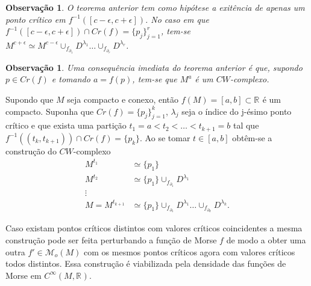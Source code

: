 \documentclass[12pt]{book}
\newtheorem{observacao}[teorema]{Observação}
\newcommand{\funcoesmorse}[1]{\mathcal{M}_{o}(#1)}
\newcommand{\funcoessuaves}[1]{C^{\infty}(#1, \real{})}
\newcommand{\pontoscriticos}[1]{\textit{Cr}(#1)}
\newcommand{\real}[1]{\mathbb{R}^{#1}}
\newcommand{\reta}{\real{}}
\begin{document}
	\begin{observacao}
		O teorema anterior tem como hipótese a exitência de apenas um ponto crítico em $f^{-1}([c-\epsilon,c+\epsilon])$. No caso em que $f^{-1}([c-\epsilon,c+\epsilon]) \cap \pontoscriticos{f} = \{p_{j}\}_{j=1}^{r}$, tem-se $M^{c+\epsilon} \simeq M^{c-\epsilon}\cup_{f_{\partial_{1}}} D^{\lambda_{1}}\dots  \cup_{f_{\partial_{r}}} D^{\lambda_{r}}$.
	\end{observacao}
	
	\begin{observacao}
		Uma consequência imediata do teorema anterior é que, supondo $p \in \pontoscriticos{f}$ e tomando $a = f(p)$, tem-se que $M^{a}$ é um $CW$-complexo. 
	\end{observacao}
	
	Supondo que $M$ seja compacto e conexo, então $f(M) = [a,b] \subset \reta$ é um compacto. Suponha que $\pontoscriticos{f} = \{p_{j}\}_{j=1}^{k}$, $\lambda_{j}$ seja o índice do j-ésimo ponto crítico e que exista uma partição $t_{1} = a < t_{2}< \dots< t_{k+1} = b$ tal que $f^{-1}((t_{k}, t_{k+1})) \cap \pontoscriticos{f} = \{p_{k}\}$. Ao se tomar $t \in [a,b]$ obtêm-se a construção do $CW$-complexo
	$$
	\begin{aligned}
	M^{t_{1}} &\simeq \{p_{1}\}
	\\
	M^{t_{2}} & \simeq \{p_{1}\} \cup_{f_{\partial_{1}}} D^{\lambda_{1}}
	\\
	\vdots&
	\\
	M = M^{t_{k+1}} &\simeq\{p_{1}\} \cup_{f_{\partial_{1}}} D^{\lambda_{1}}\dots  \cup_{f_{\partial_{k}}} D^{\lambda_{k}}.
	\end{aligned}
	$$
	
	Caso existam pontos críticos distintos com valores críticos coincidentes a mesma construção pode ser feita perturbando a função de Morse $f$ de modo a obter uma outra $f' \in \funcoesmorse{M}$ com os mesmos pontos críticos agora com valores críticos todos distintos. Essa construção é viabilizada pela densidade das funções de Morse em $\funcoessuaves{M}$.
	
\end{document}
